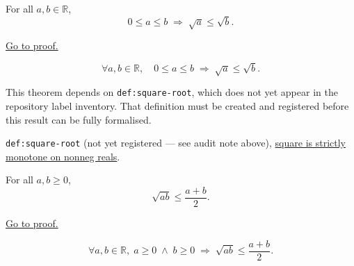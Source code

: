
\begin{theorem}
\label{thm:ineq-square-root-monotone}
For all $a, b \in \mathbb{R}$,
\[
  0 \le a \le b \;\Rightarrow\; \sqrt{a} \le \sqrt{b}.
\]
\end{theorem}



\begin{remark*}[Proof]
\hyperref[prf:ineq-square-root-monotone]{Go to proof.}
\end{remark*}

\begin{remark*}
\[
  \forall a, b \in \mathbb{R},\quad
  0 \le a \le b \;\Rightarrow\; \sqrt{a} \le \sqrt{b}.
\]
\end{remark*}

\begin{remark*}
This theorem depends on \texttt{def:square-root}, which does not yet
appear in the repository label inventory.  That definition must be
created and registered before this result can be fully formalised.
\end{remark*}

\begin{dependencies}
\texttt{def:square-root} (not yet registered --- see audit note above),
\hyperref[thm:ineq-square-monotone]{square is strictly monotone on nonneg reals}.
\end{dependencies}


\begin{theorem}
\label{thm:ineq-am-gm-two}
For all $a, b \ge 0$,
\[
  \sqrt{ab} \le \frac{a + b}{2}.
\]
\end{theorem}



\begin{remark*}[Proof]
\hyperref[prf:ineq-am-gm-two]{Go to proof.}
\end{remark*}

\begin{remark*}
\[
  \forall a, b \in \mathbb{R},\;
  a \ge 0 \;\land\; b \ge 0 \;\Rightarrow\;
  \sqrt{ab} \le \frac{a + b}{2}.
\]
\end{remark*}

